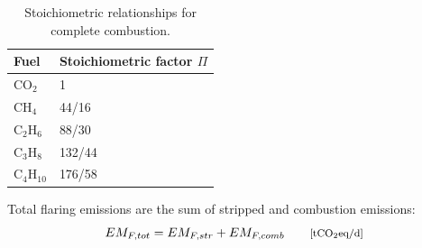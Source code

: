 \documentclass[11pt]{report}
\newcommand{\marg}[1]{{\footnotesize\textit{\textcolor{stanford}{'#1'}}}}
\newcommand{\marginnote}[1]{\marginpar{\marg{#1}}}
\begin{document}
\begin{table}
\begin{scriptsize}
\caption{Stoichiometric relationships for complete combustion.}
\label{tab:stoichiometric_relationships}
\begin{tabular*}{0.75\columnwidth}{p{}p{}}
\toprule
Fuel & Stoichiometric factor $\Pi$ \\
\midrule
CO$_2$ & 1 \\
CH$_{4}$ & 44/16 \\
C$_{2}$H$_{6}$ & 88/30 \\
C$_{3}$H$_{8}$ & 132/44 \\
C$_{4}$H$_{10}$ & 176/58 \\
\bottomrule
\end{tabular*}
\end{scriptsize}
\end{table}

Total flaring emissions are the sum of stripped and combustion emissions: \marginnote{Flaring \\ 3.2}
\begin{equation} \label{eq:flare_emissions_total}
EM_{F,tot} = EM_{F,str} + EM_{F,comb} \quad \quad \footnotesize{\text{[tCO$_{2}$eq/d]}}
\end{equation}
\end{document}
